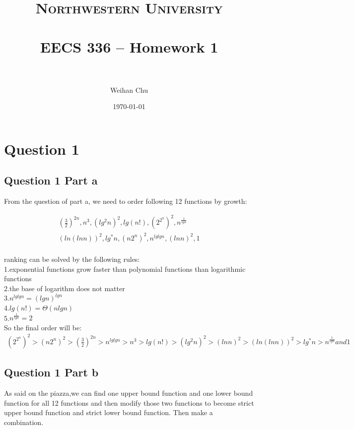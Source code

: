 \documentclass[paper=a4, fontsize=11pt]{scrartcl} %
\title{	
\normalfont \normalsize 
\textsc{Northwestern University} \\ [25pt] %
\horrule{0.5pt} \\[0.4cm] %
\huge EECS 336 -- Homework 1 \\ %
\horrule{2pt} \\[0.5cm] %
}
\author{Weihan Chu} %
\date{\normalsize\today} %
\numberwithin{equation}{section} %
\numberwithin{figure}{section} %
\numberwithin{table}{section} %
\begin{document}
\maketitle %


\section{Question 1}

\subsection{Question 1 Part a}
From the question of part a, we need to order following 12 functions by growth:

\begin{align*}
(\frac{3}{2})^{2n},
n^3,
(lg^2n)^2,
lg(n!),
\left(2^{2^n}\right)^2,
n^{\frac{1}{lgn}}\\ 
\left(ln(lnn)\right)^2,
lg^*n,
\left(n 2^n\right)^2,
n^{lglgn},
\left(lnn\right)^2,
1\\
\end{align*}

ranking can be solved by the following rules:\\
1.exponential functions grow faster than polynomial functions than logarithmic functions\\
2.the base of logarithm does not matter \\
3.$n^{lglgn}=({lgn})^{lgn}$\\
4.$lg(n!)=\Theta(nlgn)$\\
5.$n^{\frac{1}{lgn}}=2$\\ 

So the final order will be:
\begin{align*}
\left(2^{2^n}\right)^2>\left(n 2^n\right)^2>(\frac{3}{2})^{2n}>n^{lglgn}>n^3>lg(n!)>(lg^2n)^2>\left(lnn\right)^2>\left(ln(lnn)\right)^2>lg^*n> n^{\frac{1}{lgn}} and 1
\end{align*}

\subsection{Question 1 Part b}
As said on the piazza,we can find one upper bound function and one lower bound function for all 12 functions and then modify those two functions to become strict upper bound function and strict lower bound function. Then make a combination.
\end{document}
